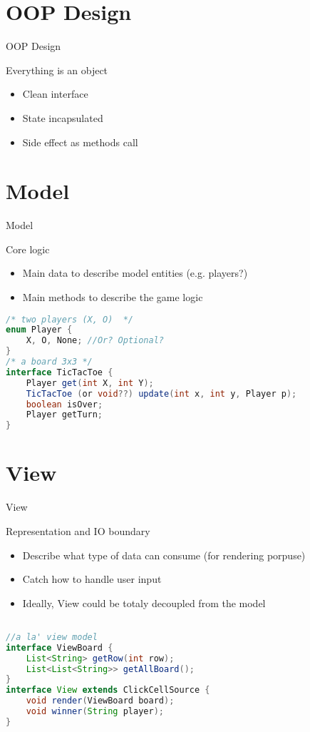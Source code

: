 \documentclass[presentation]{beamer}
\begin{document}
\section{OOP Design}
\begin{frame}[fragile]{OOP Design}
\begin{block}{Everything is an object}
  \begin{itemize}
  \item Clean interface
  \item State incapsulated
  \item Side effect as methods call
  \end{itemize}
\end{block}

\end{frame}

\section{Model}
\begin{frame}[fragile]{Model}
\begin{block}{Core logic}
  \begin{itemize}
    \item Main data to describe model entities (e.g. players?)
    \item Main methods to describe the game logic
  \end{itemize}
\end{block}
\begin{lstlisting}[language=Java]
/* two players (X, O)  */
enum Player {
    X, O, None; //Or? Optional?
}
/* a board 3x3 */
interface TicTacToe {
    Player get(int X, int Y);
    TicTacToe (or void??) update(int x, int y, Player p);
    boolean isOver;
    Player getTurn;
}
\end{lstlisting}
\end{frame}

\section{View}
\begin{frame}[fragile]{View}
\begin{block}{Representation and IO boundary}
  \begin{itemize}
    \item Describe what type of data can consume (for rendering porpuse)
    \item Catch how to handle user input
    \item Ideally, View could be totaly decoupled from the model
  \end{itemize}
\end{block}
\begin{lstlisting}[language=Java]

//a la' view model
interface ViewBoard {
    List<String> getRow(int row);
    List<List<String>> getAllBoard();
}
interface View extends ClickCellSource {
    void render(ViewBoard board);
    void winner(String player);
}
\end{lstlisting}
\end{frame}
\end{document}
